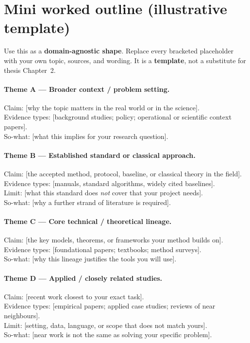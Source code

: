 \documentclass[11pt,a4paper]{article}
\begin{document}
\section{Mini worked outline (illustrative template)}
\label{sec:worked}

\begin{warnbox}
Use this as a \textbf{domain-agnostic shape}. Replace every bracketed placeholder with your own topic, sources, and wording.
It is a \textbf{template}, not a substitute for thesis Chapter~2.
\end{warnbox}

\paragraph{Theme A --- Broader context / problem setting.}
Claim: [why the topic matters in the real world or in the science].\\
Evidence types: [background studies; policy; operational or scientific context papers].\\
So-what: [what this implies for your research question].

\paragraph{Theme B --- Established standard or classical approach.}
Claim: [the accepted method, protocol, baseline, or classical theory in the field].\\
Evidence types: [manuals, standard algorithms, widely cited baselines].\\
Limit: [what this standard does \emph{not} cover that your project needs].\\
So-what: [why a further strand of literature is required].

\paragraph{Theme C --- Core technical / theoretical lineage.}
Claim: [the key models, theorems, or frameworks your method builds on].\\
Evidence types: [foundational papers; textbooks; method surveys].\\
So-what: [why this lineage justifies the tools you will use].

\paragraph{Theme D --- Applied / closely related studies.}
Claim: [recent work closest to your exact task].\\
Evidence types: [empirical papers; applied case studies; reviews of near neighbours].\\
Limit: [setting, data, language, or scope that does not match yours].\\
So-what: [near work is not the same as solving your specific problem].
\end{document}
